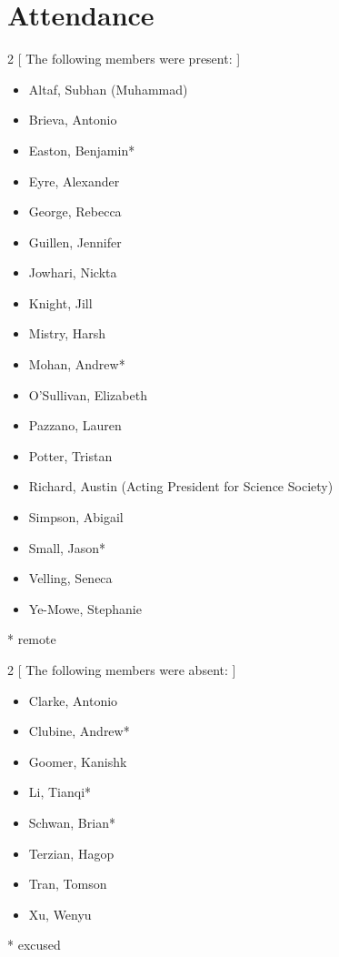 \section*{Attendance}

\begin{multicols}{2}
    [
        The following members were present:
    ]
\begin{itemize}

    \item Altaf, Subhan (Muhammad)
    \item Brieva, Antonio
    \item Easton, Benjamin*
    \item Eyre, Alexander
    \item George, Rebecca
    \item Guillen, Jennifer
    \item Jowhari, Nickta 
    \item Knight, Jill
    \item Mistry, Harsh
    \item Mohan, Andrew*
    \item O'Sullivan, Elizabeth
    \item Pazzano, Lauren 
    \item Potter, Tristan
    \item Richard, Austin  (Acting President for Science Society)
    \item Simpson, Abigail
    \item Small, Jason*
    \item Velling, Seneca
    \item Ye-Mowe, Stephanie

\end{itemize}

\end{multicols}
* remote \\

\begin{multicols}{2}
    [
        The following members were absent:
    ]
\begin{itemize}

    \item Clarke, Antonio
    \item Clubine, Andrew*
    \item Goomer, Kanishk
    \item Li, Tianqi*
    \item Schwan, Brian* 
    \item Terzian, Hagop
    \item Tran, Tomson
    \item Xu, Wenyu

\end{itemize}
\end{multicols}
* excused\\



